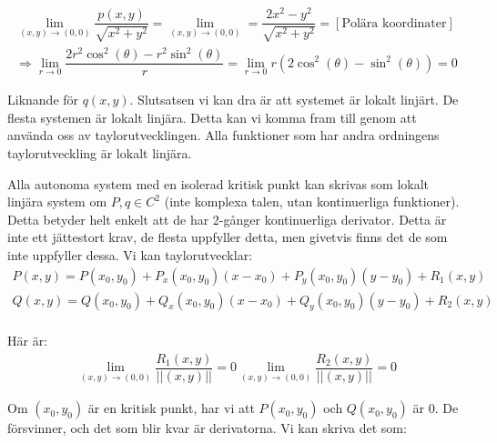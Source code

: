 \begin{equation*}
  \begin{gathered}
    \lim_{(x,y)\to(0,0)}\dfrac{p(x,y)}{\sqrt{x^2+y^2}} = \lim_{(x,y)\to(0,0)} = \dfrac{2x^2-y^2}{\sqrt{x^2+y^2}} = [\text{Polära koordinater}]\\
    \Rightarrow \lim_{r\to0}\dfrac{2r^2\cos^2(\theta)-r^2\sin^2(\theta)}{r} = \lim_{r\to0}r\left(2\cos^2(\theta)-\sin^2(\theta)\right) = 0
  \end{gathered}
\end{equation*}
\par\bigskip
\noindent Liknande för $q(x,y)$. Slutsatsen vi kan dra är att systemet är lokalt linjärt. De flesta systemen är lokalt linjära. Detta kan vi komma fram till genom att använda oss av taylorutvecklingen. Alla funktioner som har andra ordningens taylorutveckling är lokalt linjära.
\par\bigskip
\noindent Alla autonoma system med en isolerad kritisk punkt kan skrivas som lokalt linjära system om $P,q\in C^2$ (inte komplexa talen, utan kontinuerliga funktioner). Detta betyder helt enkelt att de har 2-gånger kontinuerliga derivator. Detta är inte ett jättestort krav, de flesta uppfyller detta, men givetvis finns det de som inte uppfyller dessa. Vi kan taylorutvecklar:
\begin{equation*}
  \begin{gathered}
    P(x,y) = P(x_0,y_0)+P_x(x_0,y_0)(x-x_0)+P_y(x_0,y_0)(y-y_0)+R_1(x,y)\\
    Q(x,y) = Q(x_0,y_0)+Q_x(x_0,y_0)(x-x_0)+Q_y(x_0,y_0)(y-y_0)+R_2(x,y)\\
  \end{gathered}
\end{equation*}
\par\bigskip
\noindent Här är:
\begin{equation*}
  \begin{gathered}
    \lim_{(x,y)\to(0,0)}\dfrac{R_1(x,y)}{\left|\left|(x,y)\right|\right|} = 0
    \lim_{(x,y)\to(0,0)}\dfrac{R_2(x,y)}{\left|\left|(x,y)\right|\right|} = 0
  \end{gathered}
\end{equation*}
\par\bigskip
\noindent Om $(x_0,y_0)$ är en kritisk punkt, har vi att $P(x_0,y_0)$ och $Q(x_0,y_0)$ är 0. De försvinner, och det som blir kvar är derivatorna. Vi kan skriva det som:
